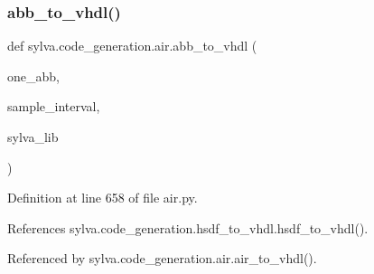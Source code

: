 \subsubsection{\texorpdfstring{abb\+\_\+to\+\_\+vhdl()}{abb\_to\_vhdl()}}
{\footnotesize\ttfamily def sylva.\+code\+\_\+generation.\+air.\+abb\+\_\+to\+\_\+vhdl (\begin{DoxyParamCaption}\item[{}]{one\+\_\+abb,  }\item[{}]{sample\+\_\+interval,  }\item[{}]{sylva\+\_\+lib }\end{DoxyParamCaption})}



Definition at line 658 of file air.\+py.



References sylva.\+code\+\_\+generation.\+hsdf\+\_\+to\+\_\+vhdl.\+hsdf\+\_\+to\+\_\+vhdl().



Referenced by sylva.\+code\+\_\+generation.\+air.\+air\+\_\+to\+\_\+vhdl().


